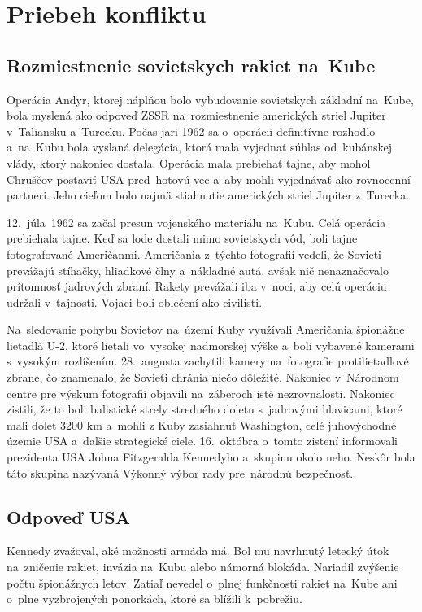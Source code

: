 \documentclass[a4paper]{article}
\begin{document}
\newpage

\section{Priebeh konfliktu}
\subsection{Rozmiestnenie sovietskych rakiet na~Kube}
Operácia Andyr, ktorej náplňou bolo vybudovanie sovietskych základní na~Kube, bola myslená ako odpoveď ZSSR na~rozmiestnenie amerických striel Jupiter v~Taliansku a~Turecku. Počas jari 1962 sa o~operácii definitívne rozhodlo a~na~Kubu bola vyslaná delegácia, ktorá mala vyjednať súhlas od~kubánskej vlády, ktorý nakoniec dostala. Operácia mala prebiehať tajne, aby mohol Chruščov postaviť USA pred~hotovú vec a~aby mohli vyjednávať ako rovnocenní 
partneri. Jeho cieľom bolo najmä stiahnutie amerických striel Jupiter z~Turecka.

12.~júla~1962 sa začal presun vojenského materiálu na~Kubu. Celá operácia prebiehala tajne. Keď sa lode dostali mimo sovietskych vôd, boli tajne fotografované Američanmi. Američania z~týchto fotografií vedeli, že Sovieti prevážajú stíhačky, hliadkové člny a~nákladné autá, avšak nič nenaznačovalo prítomnosť jadrových zbraní. Rakety prevážali iba v~noci, aby celú operáciu udržali v~tajnosti. Vojaci boli oblečení ako civilisti.

Na~sledovanie pohybu Sovietov na~území Kuby využívali Američania špionážne lietadlá U-2, ktoré lietali vo~vysokej nadmorskej výške a~boli vybavené kamerami s~vysokým rozlíšením. 28.~augusta zachytili kamery na~fotografie protilietadlové zbrane, čo znamenalo, že Sovieti chránia niečo dôležité. Nakoniec v~Národnom centre pre výskum fotografií objavili na~záberoch isté nezrovnalosti. Nakoniec zistili, že to boli balistické strely stredného doletu s~jadrovými hlavicami, ktoré mali dolet 3200 km a~mohli z Kuby zasiahnuť Washington, celé juhovýchodné územie USA a~ďalšie strategické ciele. 16.~októbra o~tomto zistení informovali prezidenta USA Johna Fitzgeralda Kennedyho a~skupinu okolo neho. Neskôr bola táto skupina nazývaná Výkonný výbor rady pre~národnú bezpečnosť.

\subsection{Odpoveď USA}
Kennedy zvažoval, aké možnosti armáda má. Bol mu navrhnutý letecký útok na~zničenie rakiet, invázia na~Kubu alebo námorná blokáda. Nariadil zvýšenie počtu špionážnych letov. Zatiaľ nevedel o~plnej funkčnosti rakiet na~Kube ani o~plne vyzbrojených ponorkách, ktoré sa blížili k~pobrežiu.
\end{document}
